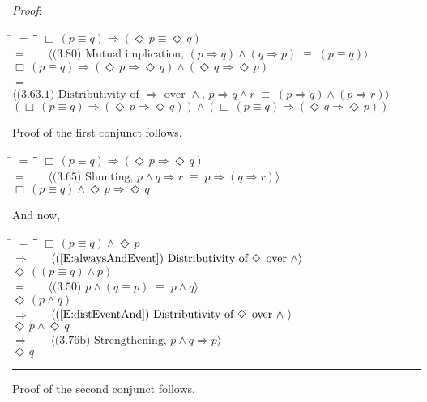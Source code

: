 \documentclass[12pt, fleqn, leqno]{article}
\newcommand{\lgap}{2pt}                             %
\newcommand{\mymathindent}{24pt}                    %
\newcommand{\equivs}{\ensuremath{\;\equiv\;}}       %
\newcommand{\impl}{\ensuremath{\Rightarrow}}        %
\newcommand{\Event}{\Diamond\,}
\newcommand{\Always}{\Box\,}
\newcommand{\myqed}{\rule[-.23ex]{1.2ex}{2.0ex}}
\newcommand{\myqedtab}{\hspace{384pt}}              %
\newcommand{\Gll} {\langle}                         %
\newcommand{\Ggg} {\rangle}                         %
\newcommand{\Hint}[1]     {\ \ \ $\Gll              \mbox{#1} \Ggg$ }   %
\begin{document}
\emph{Proof}: 
\begin{tabbing}
\hspace{\mymathindent} \= $= \;$ \= \myqedtab \= \kill
  \> \>   $\Always (p \equiv q) \impl (\Event p \equiv \Event q) $\\[\lgap]
  \> $=$  \>  \Hint{(3.80) Mutual implication, $(p\impl q) \land (q\impl p) \equivs (p\equiv q)$}\\[\lgap]
  \> \>   $\Always (p \equiv q) \impl (\Event p \impl \Event q)\land (\Event q \impl \Event p)$\\[\lgap]
  \> $=$  \>  \Hint{(3.63.1) Distributivity of $\impl$ over $\land$, $p\impl q\land r\equivs (p\impl q)\land (p\impl r)$}\\[\lgap]
  \> \>   $(\Always (p \equiv q) \impl (\Event p \impl \Event q)) \land (\Always (p \equiv q) \impl (\Event q \impl \Event p))$
  \end{tabbing}
Proof of the first conjunct follows.
\begin{tabbing}
\hspace{\mymathindent} \= $= \;$ \= \myqedtab \= \kill
  \> \>   $\Always (p \equiv q) \impl (\Event p \impl \Event q)$\\[\lgap]
  \> $=$  \>  \Hint{(3.65) Shunting, $p\land q\impl r\equivs p\impl (q\impl r)$}\\[\lgap]
  \> \>   $\Always (p \equiv q) \land \Event p \impl \Event q$
\end{tabbing}
And now,
\begin{tabbing}
\hspace{\mymathindent} \= $= \;$ \= \myqedtab \= \kill
  \> \>   $\Always (p \equiv q) \land \Event p$\\[\lgap]
  \> $\impl$  \>  \Hint{(\ref{E:alwaysAndEvent}) Distributivity of $\Event$ over $\land$}\\[\lgap]
  \> \>   $\Event ((p \equiv q) \land p)$\\[\lgap]
  \> $=$  \>  \Hint{(3.50) $p\land (q\equiv p)\equivs p\land q$}\\[\lgap]
  \> \>   $\Event (p \land q)$\\[\lgap]
  \> $\impl$  \>  \Hint{(\ref{E:distEventAnd}) Distributivity of $\Event$ over $\land$ }\\[\lgap]
  \> \>   $\Event p \land \Event q $\\[\lgap]
  \> $\impl$ \> \Hint{(3.76b) Strengthening, $p\land q \impl p$} \\[\lgap]
  \> \>   $\Event q$\quad \myqed
\end{tabbing}
Proof of the second conjunct follows.
\end{document}

